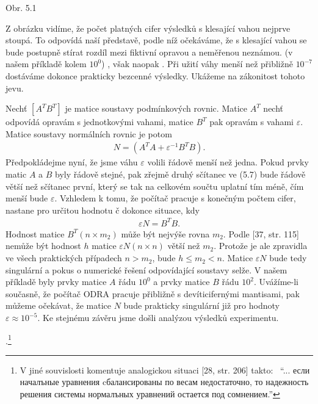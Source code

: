 \begin{center}

Obr. 5.1
\end{center}

Z obrázku vidíme, že počet platných cifer výsledků s klesající
vahou nejprve stoupá. To odpovídá naší představě, podle níž
očekáváme, že s klesající vahou se bude postupně stírat rozdíl mezi
fiktivní opravou a neměřenou neznámou.
(v našem příkladě kolem $10^0$) , však naopak
.
Při užití váhy menší než přibližně $10^{-7}$ dostáváme dokonce
prakticky bezcenné výsledky. Ukážeme na zákonitost tohoto jevu.


Nechť $[A^T B^T]$ je matice soustavy podmínkových rovnic. Matice $A^T$
nechť odpovídá opravám s jednotkovými vahami, matice $B^T$ pak opravám
s vahami $\varepsilon$. Matice soustavy normálních rovnic je potom
%
\begin{align*}
\tag{5.7}
        N = (A^TA + \varepsilon^{-1}B^TB).
\end{align*} 
%
Předpokládejme nyní, že jsme váhu $\varepsilon$ volili řádově menší
než jedna. Pokud prvky matic $A$ a $B$ byly řádově stejné, pak zřejmě
druhý sčítanec ve (5.7) bude řádově větší než sčítanec první, který se
tak na celkovém součtu uplatní tím méně, čím menší bude
$\varepsilon$. Vzhledem k tomu, že počítač pracuje s konečným počtem
cifer, nastane pro určitou hodnotu č dokonce situace, kdy
%
\begin{align*}
\tag{5.8}
        \varepsilon N = B^TB.
\end{align*}
%
Hodnost matice $B^T(n \times m_2)$ může být nejvýše rovna $m_2$.  Podle
[37, str. 115] nemůže být hodnost $h$ matice $\varepsilon N(n \times
n)$ větší než $m_2$.  Protože je ale zpravidla ve všech praktických
případech $n > m_2$, bude $h \le m_2 < n$.  Matice $\varepsilon N$
bude tedy singulární a pokus o numerické řešení odpovídající soustavy
selže. V našem příkladě byly prvky matice $A$ řádu $10^0$ a prvky
matice $B$ řádu $10^2$. Uvážíme-li současně, že počítač ODRA pracuje
přibližně s devíticifernými mantisami, pak můžeme očekávat, že matice
$N$ bude prakticky singulární již pro hodnoty $\varepsilon \approx
10^{-5}$. Ke stejnému závěru jsme došli analýzou výsledků experimentu.

%
%
.\footnote%
{
V jiné souvislosti komentuje analogickou situaci 
[28, str. 206] takto:~
%
``... если началъные уравнения cбалансированы по весам
недостаточно, то надежность решения системы нормалъных
уравнений остается под сомнением.''
%
}
%
%
%
%
%
%


